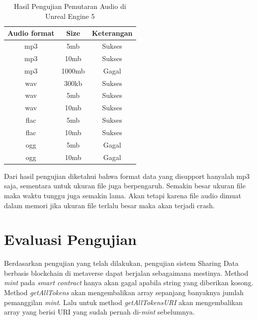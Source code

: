 \begin{longtable}{|c|c|c|}
  \caption{Hasil Pengujian Pemutaran Audio di Unreal Engine 5}
  \label{tb:UjiIntegrasiPemutaranAudio}                       \\
  \hline
  \rowcolor[HTML]{C0C0C0}
  \textbf{Audio format} & \textbf{Size} & \textbf{Keterangan} \\
  \hline
  mp3                   & 5mb           & Sukses              \\
  mp3                   & 10mb          & Sukses              \\
  mp3                   & 1000mb        & Gagal               \\
  wav                   & 300kb         & Sukses              \\
  wav                   & 5mb           & Sukses              \\
  wav                   & 10mb          & Sukses              \\
  flac                  & 5mb           & Sukses              \\
  flac                  & 10mb          & Sukses              \\
  ogg                   & 5mb           & Gagal               \\
  ogg                   & 10mb          & Gagal               \\
  \hline
\end{longtable}

Dari hasil pengujian diketahui bahwa format data yang disupport hanyalah mp3 saja, sementara untuk ukuran file juga berpengaruh.
Semakin besar ukuran file maka waktu tunggu juga semakin lama. Akan tetapi karena file audio dimuat dalam memori jika ukuran file terlalu besar maka
akan terjadi crash.

\section{Evaluasi Pengujian}
Berdasarkan pengujian yang telah dilakukan, pengujian sistem Sharing Data berbasis blockchain di metaverse dapat berjalan sebagaimana mestinya.
Method \emph{mint} pada \emph{smart contract} hanya akan gagal apabila string yang diberikan kosong. Method \emph{getAllTokens} akan mengembalikan array sepanjang banyaknya jumlah
pemanggilan \emph{mint}. Lalu untuk method \emph{getAllTokensURI} akan mengembalikan array yang berisi URI yang sudah pernah di-\emph{mint} sebelumnya.


